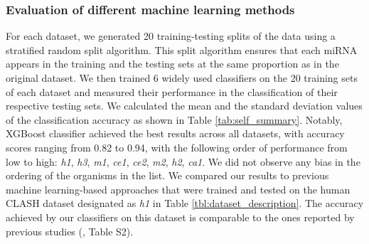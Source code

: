 \documentclass{bmcart}
\begin{document}
\subsubsection*{Evaluation of different machine learning methods} \label{sec:evaluation_different_ML}
For each dataset, we generated 20 training-testing splits of the data using a stratified random split algorithm. This split algorithm ensures that each miRNA appears in the training and the testing sets at the same proportion as in the original dataset.
We then trained 6 widely used classifiers on the 20 training sets of each dataset and measured their performance in the classification of their respective testing sets. We calculated the mean and the standard deviation values of the classification accuracy as shown in Table \ref{tab:self_summary}. Notably, XGBoost classifier achieved the best results across all datasets, with accuracy scores ranging from 0.82 to 0.94, with the following order of performance from low to high: \textit{h1},  \textit{h3},  \textit{m1}, \textit{ce1}, \textit{ce2}, \textit{m2}, \textit{h2}, \textit{ca1}. We did not observe any bias in the ordering of the organisms in the list.   
We compared our results to previous machine learning-based approaches that were trained and tested on the human CLASH dataset designated as \textit{h1} in Table \ref{tbl:dataset_description}. The accuracy achieved by our classifiers on this dataset is comparable to the ones reported by previous studies (, Table S2). 
\end{document}
